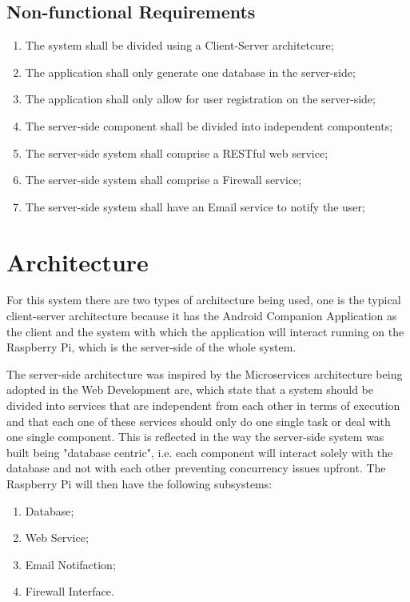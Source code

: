 \subsection{Non-functional Requirements}
\label{chap3:sec:reqs:non-func}
\begin{enumerate}
	\item The system shall be divided using a Client-Server architetcure;
	\item The application shall only generate one database in the server-side;
	\item The application shall only allow for user registration on the
		server-side;
	\item The server-side component shall be divided into independent
		compontents;
	\item The server-side system shall comprise a RESTful web service;
	\item The server-side system shall comprise a Firewall service;
	\item The server-side system shall have an Email service to notify the user;
\end{enumerate}

\section{Architecture}
\label{chap3:sec:arch}
For this system there are two types of architecture being used, one is the
typical client-server architecture because it has the Android Companion
Application as the client and the system with which the application will
interact running on the Raspberry Pi, which is the server-side of the whole
system.

The server-side architecture was inspired by the
Microservices architecture being adopted in the Web Development are, which state
that a system should be divided into services that are independent from each
other in terms of execution and that each one of these services should only do
one single task or deal with one single component. This is reflected in the way
the server-side system was built being "database centric", i.e. each component
will interact solely with the database and not with each other preventing
concurrency issues upfront. The Raspberry Pi will then have the following
subsystems:
\begin{enumerate}
	\item Database;
	\item Web Service;
	\item Email Notifaction;
	\item Firewall Interface.
\end{enumerate}

